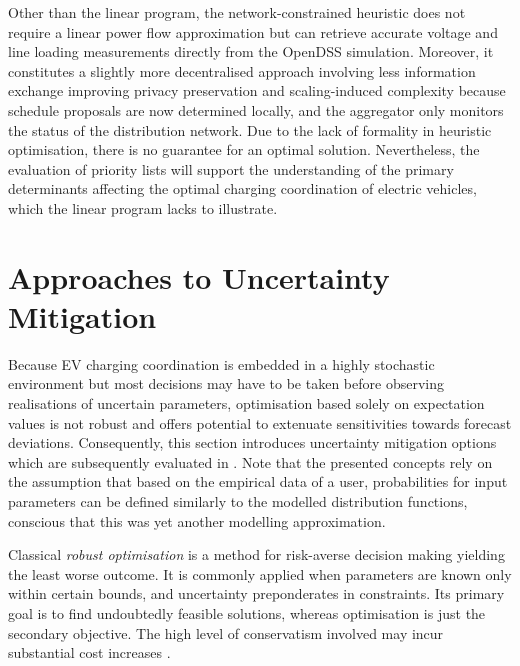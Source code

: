 \begin{algorithm}[h]
\begin{spacing}{1.2}
\begin{algorithmic}[1]
		\EndWhile
		

		\EndFor
		\State {}
	\end{algorithmic}
	\end{spacing}
	\label{alg:network}
\end{algorithm}

Other than the linear program, the network-constrained heuristic does not require a linear power flow approximation but can retrieve accurate voltage and line loading measurements directly from the OpenDSS simulation. Moreover, it constitutes a slightly more decentralised approach involving less information exchange improving privacy preservation and scaling-induced complexity because schedule proposals are now determined locally, and the aggregator only monitors the status of the distribution network. Due to the lack of formality in heuristic optimisation, there is no guarantee for an optimal solution. Nevertheless, the evaluation of priority lists will support the understanding of the primary determinants affecting the optimal charging coordination of electric vehicles, which the linear program lacks to illustrate.

\section{Approaches to Uncertainty Mitigation}
\label{sec:uncmitigation}


Because EV charging coordination is embedded in a highly stochastic environment but most decisions may have to be taken before observing realisations of uncertain parameters, optimisation based solely on expectation values is not robust and offers potential to extenuate sensitivities towards forecast deviations. Consequently, this section introduces uncertainty mitigation options which are subsequently evaluated in . Note that the presented concepts rely on the assumption that based on the empirical data of a user, probabilities for input parameters can be defined similarly to the modelled distribution functions, conscious that this was yet another modelling approximation. 

Classical \textit{robust optimisation} is a method for risk-averse decision making yielding the least worse outcome. It is commonly applied when parameters are known only within certain bounds, and uncertainty preponderates in constraints. Its primary goal is to find undoubtedly feasible solutions, whereas optimisation is just the secondary objective. The high level of conservatism involved may incur substantial cost increases \cite{Bertsimas2004}. 

